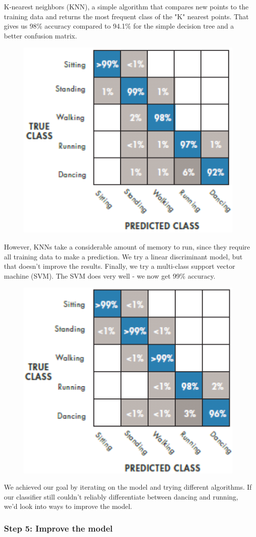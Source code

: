 \documentclass[a4paper]{article}
\begin{document}
			\newpage
			
			K-nearest neighbors (KNN), a simple algorithm that compares new points to the training data and returns the most frequent class of the "K" nearest points.
			That gives us 98\% accuracy compared to 94.1\% for the simple decision tree and a better confusion matrix.
			
			\begin{figure}[htb!]
				\centering
				\includegraphics[width=.45\textwidth]{img/sw09/step4_knn.png}
			\end{figure}
			
			However, KNNs take a considerable amount of memory to run, since they require all training data to make a prediction.
			We try a linear discriminant model, but that doesn't improve the results.
			Finally, we try a multi-class support vector machine (SVM).
			The SVM does very well - we now get 99\% accuracy.
			
			\begin{figure}[htb!]
				\centering
				\includegraphics[width=.45\textwidth]{img/sw09/step4_svm.png}
			\end{figure}
		
			We achieved our goal by iterating on the model and trying different algorithms.
			If our classifier still couldn't reliably differentiate between dancing and running, we'd look into ways to improve the model.
			
			\newpage
				
			\subsubsection{Step 5: Improve the model}
			
\end{document}
